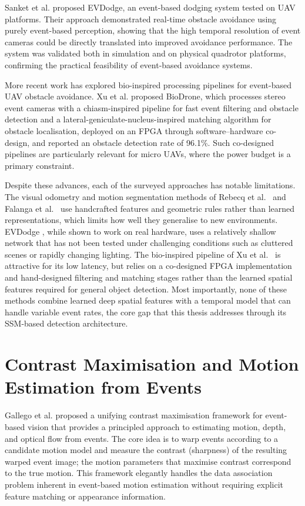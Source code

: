 \documentclass[11pt, a4paper]{report}
\begin{document}
Sanket et al. \cite{sanket2020evdodgenet} proposed EVDodge, an event-based dodging system tested on UAV platforms. Their approach demonstrated real-time obstacle avoidance using purely event-based perception, showing that the high temporal resolution of event cameras could be directly translated into improved avoidance performance. The system was validated both in simulation and on physical quadrotor platforms, confirming the practical feasibility of event-based avoidance systems. 

More recent work has explored bio-inspired processing pipelines for event-based UAV obstacle avoidance. Xu et al. \cite{li2024taming} proposed BioDrone, which processes stereo event cameras with a chiasm-inspired pipeline for fast event filtering and obstacle detection and a lateral-geniculate-nucleus-inspired matching algorithm for obstacle localisation, deployed on an FPGA through software--hardware co-design, and reported an obstacle detection rate of 96.1\%. Such co-designed pipelines are particularly relevant for micro UAVs, where the power budget is a primary constraint. 

Despite these advances, each of the surveyed approaches has notable limitations. The visual odometry and motion segmentation methods of Rebecq et al.\ \cite{rebecq2017real} and Falanga et al.\ \cite{falanga2020dynamic} use handcrafted features and geometric rules rather than learned representations, which limits how well they generalise to new environments. EVDodge \cite{sanket2020evdodgenet}, while shown to work on real hardware, uses a relatively shallow network that has not been tested under challenging conditions such as cluttered scenes or rapidly changing lighting. The bio-inspired pipeline of Xu et al.\ \cite{li2024taming} is attractive for its low latency, but relies on a co-designed FPGA implementation and hand-designed filtering and matching stages rather than the learned spatial features required for general object detection. Most importantly, none of these methods combine learned deep spatial features with a temporal model that can handle variable event rates, the core gap that this thesis addresses through its SSM-based detection architecture. 

\section{Contrast Maximisation and Motion Estimation from Events}
Gallego et al. \cite{gallego2018unifying} proposed a unifying contrast maximisation framework for event-based vision that provides a principled approach to estimating motion, depth, and optical flow from events. The core idea is to warp events according to a candidate motion model and measure the contrast (sharpness) of the resulting warped event image; the motion parameters that maximise contrast correspond to the true motion. This framework elegantly handles the data association problem inherent in event-based motion estimation without requiring explicit feature matching or appearance information. 
\end{document}
